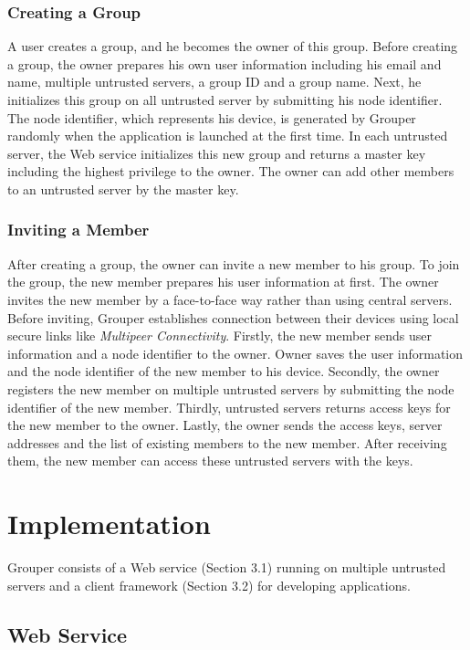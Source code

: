 \documentclass[twocolumn,10pt]{article}
\begin{document}
\subsubsection{Creating a Group}

A user creates a group, and he becomes the owner of this group.  
Before creating a group, the owner prepares his own user information including his email and name, multiple untrusted servers, a group ID and a group name. 
Next, he initializes this group on all untrusted server by submitting his node identifier. 
The node identifier, which represents his device, is generated by Grouper randomly when the application is launched at the first time. 
In each untrusted server, the Web service initializes this new group and returns a master key including the highest privilege to the owner. 
The owner can add other members to an untrusted server by the master key.

\subsubsection{Inviting a Member}

After creating a group, the owner can invite a new member to his group. 
To join the group, the new member prepares his user information at first. 
The owner invites the new member by a face-to-face way rather than using central servers. 
Before inviting, Grouper establishes connection between their devices using local secure links like \emph{Multipeer Connectivity}\cite{mc}. 
Firstly, the new member sends user information and a node identifier to the owner. 
Owner saves the user information and the node identifier of the new member to his device. 
Secondly, the owner registers the new member on multiple untrusted servers by submitting the node identifier of the new member. 
Thirdly, untrusted servers returns access keys for the new member to the owner. 
Lastly, the owner sends the access keys, server addresses and the list of existing members to the new member. 
After receiving them, the new member can access these untrusted servers with the keys.

\section{Implementation}

Grouper consists of a Web service (Section 3.1) running on multiple untrusted servers and a client framework (Section 3.2) for developing applications.

\subsection{Web Service}
\end{document}
